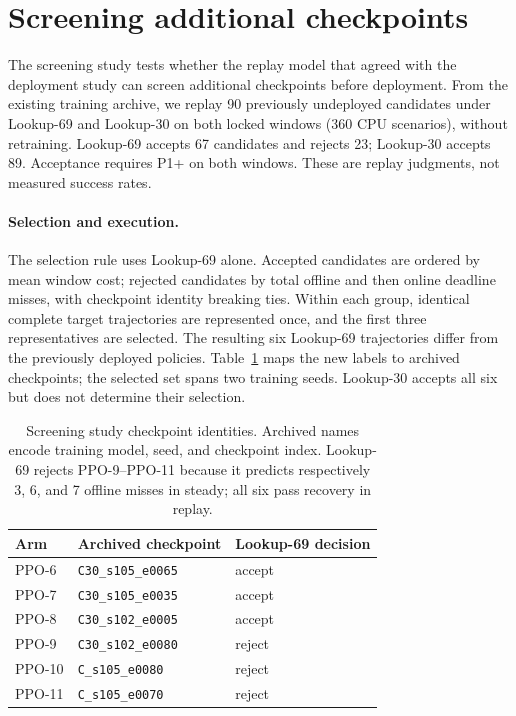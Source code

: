 \section{Screening additional checkpoints}
\label{app:e3}
The screening study tests whether the replay model that agreed with the deployment study can screen additional
checkpoints before deployment. From the existing training archive, we replay
90 previously undeployed candidates under Lookup-69 and Lookup-30 on both locked windows
(360 CPU scenarios), without retraining. Lookup-69 accepts 67 candidates and rejects
23; Lookup-30 accepts 89. Acceptance requires P1+ on both windows. These are replay
judgments, not measured success rates.

\paragraph{Selection and execution.}
The selection rule uses Lookup-69 alone. Accepted candidates are ordered by mean
window cost; rejected candidates by total offline and then online deadline
misses, with checkpoint identity breaking ties. Within each group, identical
complete target trajectories are represented once, and the first three
representatives are selected. The resulting six Lookup-69 trajectories differ from
the previously deployed policies. Table~\ref{tab:e3identities} maps the new
labels to archived checkpoints; the selected set spans two training seeds.
Lookup-30 accepts all six but does not determine their selection.

\begin{table}[t]
\centering
\small
\caption{Screening study checkpoint identities. Archived names encode training model, seed, and
checkpoint index. Lookup-69 rejects PPO-9--PPO-11 because it predicts respectively 3, 6,
and 7 offline misses in steady; all six pass recovery in replay.}
\label{tab:e3identities}
\setlength{\tabcolsep}{3pt}
\par\vspace{4pt}
\begin{tabular*}{\linewidth}{@{\extracolsep{\fill}}lll@{}}
\toprule
Arm & Archived checkpoint & Lookup-69 decision\\
\midrule
PPO-6 & \texttt{C30\_s105\_e0065} & accept\\
PPO-7 & \texttt{C30\_s105\_e0035} & accept\\
PPO-8 & \texttt{C30\_s102\_e0005} & accept\\
PPO-9 & \texttt{C30\_s102\_e0080} & reject\\
PPO-10 & \texttt{C\_s105\_e0080} & reject\\
PPO-11 & \texttt{C\_s105\_e0070} & reject\\
\bottomrule
\end{tabular*}
\end{table}

